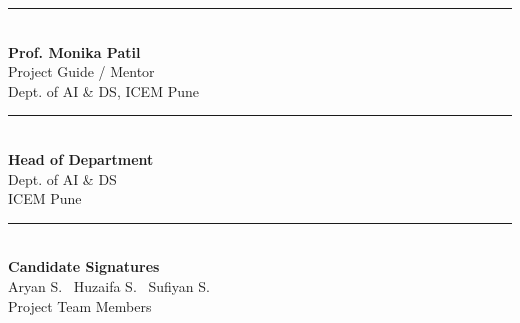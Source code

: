 \documentclass[10pt,a4paper]{article}
\begin{document}
\vspace{0.3cm}
\noindent
\begin{minipage}[t]{0.3\textwidth}
    \rule{4.5cm}{0.4pt}\\
    \textbf{Prof. Monika Patil}\\
    Project Guide / Mentor\\
    Dept. of AI \& DS, ICEM Pune
\end{minipage}
\hfill
\begin{minipage}[t]{0.3\textwidth}
    \rule{4.5cm}{0.4pt}\\
    \textbf{Head of Department}\\
    Dept. of AI \& DS\\
    ICEM Pune
\end{minipage}
\hfill
\begin{minipage}[t]{0.3\textwidth}
    \rule{4.5cm}{0.4pt}\\
    \textbf{Candidate Signatures}\\
    Aryan S. \textbar\ Huzaifa S. \textbar\ Sufiyan S.\\
    Project Team Members
\end{minipage}
\end{document}
